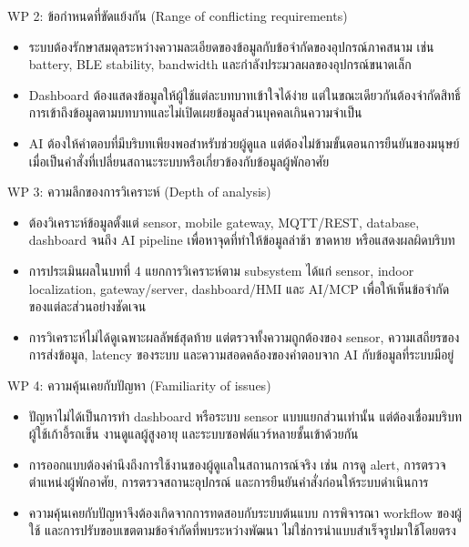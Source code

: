 \noindent\wschecked WP 2: ข้อกำหนดที่ขัดแย้งกัน (Range of conflicting requirements)
\begin{itemize}
    \item ระบบต้องรักษาสมดุลระหว่างความละเอียดของข้อมูลกับข้อจำกัดของอุปกรณ์ภาคสนาม เช่น battery, BLE stability, bandwidth และกำลังประมวลผลของอุปกรณ์ขนาดเล็ก 
    \item Dashboard ต้องแสดงข้อมูลให้ผู้ใช้แต่ละบทบาทเข้าใจได้ง่าย แต่ในขณะเดียวกันต้องจำกัดสิทธิ์การเข้าถึงข้อมูลตามบทบาทและไม่เปิดเผยข้อมูลส่วนบุคคลเกินความจำเป็น 
    \item AI ต้องให้คำตอบที่มีบริบทเพียงพอสำหรับช่วยผู้ดูแล แต่ต้องไม่ข้ามขั้นตอนการยืนยันของมนุษย์เมื่อเป็นคำสั่งที่เปลี่ยนสถานะระบบหรือเกี่ยวข้องกับข้อมูลผู้พักอาศัย 
\end{itemize}

\noindent\wschecked WP 3: ความลึกของการวิเคราะห์ (Depth of analysis)
\begin{itemize}
    \item ต้องวิเคราะห์ข้อมูลตั้งแต่ sensor, mobile gateway, MQTT/REST, database, dashboard จนถึง AI pipeline เพื่อหาจุดที่ทำให้ข้อมูลล่าช้า ขาดหาย หรือแสดงผลผิดบริบท 
    \item การประเมินผลในบทที่ 4 แยกการวิเคราะห์ตาม subsystem ได้แก่ sensor, indoor localization, gateway/server, dashboard/HMI และ AI/MCP เพื่อให้เห็นข้อจำกัดของแต่ละส่วนอย่างชัดเจน 
    \item การวิเคราะห์ไม่ได้ดูเฉพาะผลลัพธ์สุดท้าย แต่ตรวจทั้งความถูกต้องของ sensor, ความเสถียรของการส่งข้อมูล, latency ของระบบ และความสอดคล้องของคำตอบจาก AI กับข้อมูลที่ระบบมีอยู่ 
\end{itemize}

\noindent\wschecked WP 4: ความคุ้นเคยกับปัญหา (Familiarity of issues)
\begin{itemize}
    \item ปัญหาไม่ได้เป็นการทำ dashboard หรือระบบ sensor แบบแยกส่วนเท่านั้น แต่ต้องเชื่อมบริบทผู้ใช้เก้าอี้รถเข็น งานดูแลผู้สูงอายุ และระบบซอฟต์แวร์หลายชั้นเข้าด้วยกัน 
    \item การออกแบบต้องคำนึงถึงการใช้งานของผู้ดูแลในสถานการณ์จริง เช่น การดู alert, การตรวจตำแหน่งผู้พักอาศัย, การตรวจสถานะอุปกรณ์ และการยืนยันคำสั่งก่อนให้ระบบดำเนินการ 
    \item ความคุ้นเคยกับปัญหาจึงต้องเกิดจากการทดสอบกับระบบต้นแบบ การพิจารณา workflow ของผู้ใช้ และการปรับขอบเขตตามข้อจำกัดที่พบระหว่างพัฒนา ไม่ใช่การนำแบบสำเร็จรูปมาใช้โดยตรง 
\end{itemize}

